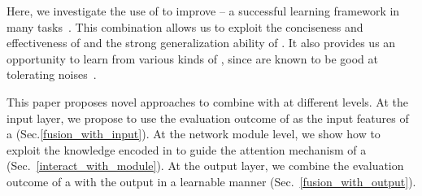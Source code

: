 
Here, we investigate the use of \REs to improve \NNs -- a successful learning framework in many \NLP
tasks~\cite{goldberg2017neural}.
This combination allows us to exploit the conciseness and effectiveness of \REs and the strong generalization ability of \NNs.
It also provides us  an opportunity
to learn from various kinds of  \REs,
since \NNs are known to be good at tolerating noises~\cite{xie2016disturblabel}.




This paper proposes novel approaches to combine \REs with \NNs at different levels.  At the input layer, we propose to use the evaluation
outcome of \REs as the input features of a \NN (Sec.\ref{fusion_with_input}).
At the network module level, we show how to
exploit the knowledge encoded in \REs to guide the attention mechanism of a \NN (Sec.~\ref{interact_with_module}). At the output layer, we
combine the evaluation outcome of a \RE with the \NN output in a learnable manner (Sec.~\ref{fusion_with_output}).

